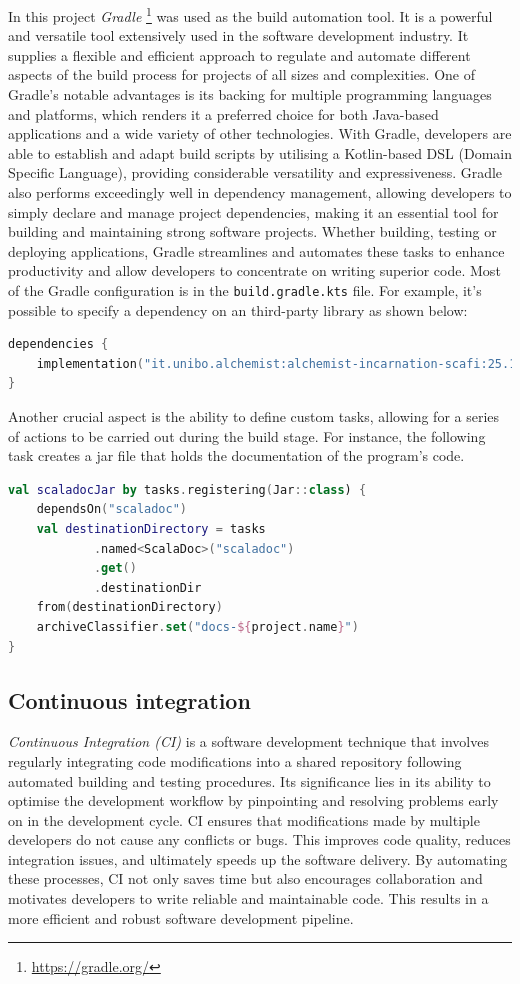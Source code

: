 \documentclass[12pt,a4paper,openright,twoside]{book}
\begin{document}
In this project \emph{Gradle} \footnote{\url{https://gradle.org/}} was used as the build automation tool. 
    It is a powerful and versatile tool extensively used in the software development industry. 
    It supplies a flexible and efficient approach to regulate and automate different aspects of the build 
    process for projects of all sizes and complexities. One of Gradle's notable advantages is its backing 
    for multiple programming languages and platforms, which renders it a preferred choice for both 
    Java-based applications and a wide variety of other technologies. With Gradle, 
    developers are able to establish and adapt build scripts by utilising a Kotlin-based DSL 
    (Domain Specific Language), providing considerable versatility and expressiveness. 
    Gradle also performs exceedingly well in dependency management, allowing developers to simply 
    declare and manage project dependencies, making it an essential tool for building and maintaining 
    strong software projects. Whether building, testing or deploying applications, Gradle streamlines 
    and automates these tasks to enhance productivity and allow developers to concentrate on 
    writing superior code.
    Most of the Gradle configuration is in the \texttt{build.gradle.kts} file.
    For example, it's possible to specify a dependency on an third-party library as shown below:
\begin{lstlisting}[language=kotlin]
dependencies {
    implementation("it.unibo.alchemist:alchemist-incarnation-scafi:25.14.6")
}
\end{lstlisting}
    Another crucial aspect is the ability to define custom tasks, allowing for a series of actions
    to be carried out during the build stage. For instance, the following task creates a jar
    file that holds the documentation of the program's code.
\begin{lstlisting}[language=kotlin]
val scaladocJar by tasks.registering(Jar::class) {
    dependsOn("scaladoc")
    val destinationDirectory = tasks
            .named<ScalaDoc>("scaladoc")
            .get()
            .destinationDir
    from(destinationDirectory)
    archiveClassifier.set("docs-${project.name}")
}
\end{lstlisting}

\subsection*{Continuous integration}
\emph{Continuous Integration (CI)} is a software development technique that involves regularly integrating code modifications into a 
    shared repository following automated building and testing procedures. 
    Its significance lies in its ability to optimise the development workflow by pinpointing and resolving problems early on 
    in the development cycle. CI ensures that modifications made by multiple developers do not cause any conflicts or bugs. 
    This improves code quality, reduces integration issues, and ultimately speeds up the software delivery. 
    By automating these processes, CI not only saves time but also encourages collaboration and motivates developers 
    to write reliable and maintainable code. This results in a more efficient and robust software development pipeline.
\end{document}
